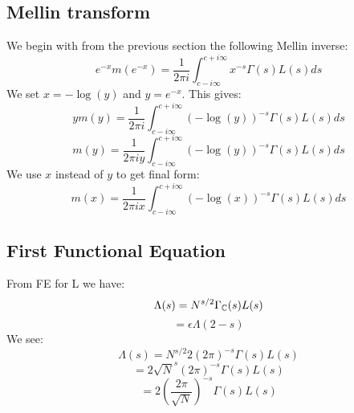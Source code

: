 \documentclass[a4paper]{amsart}
\begin{document}
\subsection{Mellin transform}

We begin with from the previous section the following Mellin inverse:
$$e^{-x}m(e^{-x}) = \frac{1}{2\pi i}\int_{c - i \infty}^{c + i \infty} x^{-s} \Gamma(s) L(s)ds$$
We set $x = -\log(y)$ and $y = e^{-x}$. This gives:
$$ym(y) = \frac{1}{2\pi i}\int_{c - i \infty}^{c + i \infty} (-\log(y))^{-s} \Gamma(s) L(s)ds$$
$$m(y) = \frac{1}{2\pi i y}\int_{c - i \infty}^{c + i \infty} (-\log(y))^{-s} \Gamma(s) L(s)ds$$
We use $x$ instead of $y$ to get final form:
$$m(x) = \frac{1}{2\pi i x}\int_{c - i \infty}^{c + i \infty} (-\log(x))^{-s} \Gamma(s) L(s)ds$$

\subsection{First Functional Equation}

From FE for L we have:
$$\Lambda(s) = N^{s/2} \Gamma_{\mathbb{C}}(s) L(s)$$
$$ = \epsilon \Lambda(2 - s)$$
We see: 
$$\Lambda(s) = N^{s/2} 2 (2\pi)^{-s} \Gamma(s) L(s)$$
$$ = 2 \sqrt{N}^{s} (2\pi)^{-s} \Gamma(s) L(s)$$
$$ = 2 \left(\frac{2\pi}{\sqrt{N}}\right)^{-s} \Gamma(s) L(s)$$
\end{document}
